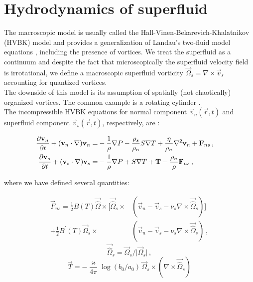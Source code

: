 
\section{Hydrodynamics of superfluid}

The macroscopic model is usually called the Hall-Vinen-Bekarevich-Khalatnikov (HVBK) model and provides a generalization of Landau's two-fluid model equations \cite{landau}, including the presence of vortices. We treat the superfluid as a continuum and despite the fact that microscopically the superfluid velocity field is irrotational, we define a macroscopic superfluid vorticity $\vec{\Omega}_s = \nabla \times \vec{v}_s$ accounting for quantized vortices.\\
The downside of this model is its assumption of spatially (not chaotically) organized vortices. The common example is a rotating cylinder \cite{osborne}.\\

The incompressible HVBK equations for normal component $\vec{v}_n (\vec{r}, t)$ and superfluid component $\vec{v}_s (\vec{r}, t)$, respectively, are \cite{barenghi}:

\begin{align}
\frac{\partial\vec{v}_n}{\partial t} + (\vec{v}_n\cdot \nabla)\vec{v}_n =& -\frac{1}{\rho} \nabla P - \frac{\rho_s}{\rho_n} S \nabla T + \frac{\eta}{\rho_n} \nabla^2 \vec{v}_n + \vec{F}_{ns}\,,
\label{motion_normal}\\
\frac{\partial\vec{v}_s}{\partial t} + (\vec{v}_s\cdot \nabla)\vec{v}_s =& -\frac{1}{\rho} \nabla P + S \nabla T + \vec{T} - \frac{\rho_n}{\rho} \vec{F}_{ns}\,,
\hspace{15mm}
\label{motion_super}
\end{align}

where we have defined several quantities:

\begin{align}
\vec{F}_{ns} =
\frac{1}{2} B(T) \vec{\hat{\Omega}} \times [\vec{\hat{\Omega}}_s \times &(\vec{v}_n - \vec{v}_s - \nu_s\nabla \times \vec{\hat{\Omega}}_s)]
\\
+ \frac{1}{2} B^{\prime}(T) \vec{\Omega}_s \times &(\vec{v}_n - \vec{v}_s - \nu_s\nabla \times \vec{\hat{\Omega}}_s)\,,
\end{align}
\begin{equation}
\vec{\hat{\Omega}}_s = \vec{\Omega}_s / \vert \vec{\Omega}_s \vert\,,
\end{equation}
\begin{equation}
\vec{T} = - \frac{\varkappa}{4\pi} \log(b_0 / a_0) \, \vec{\Omega}_s \times (\nabla \times \vec{\hat{\Omega}}_s)
\end{equation}

